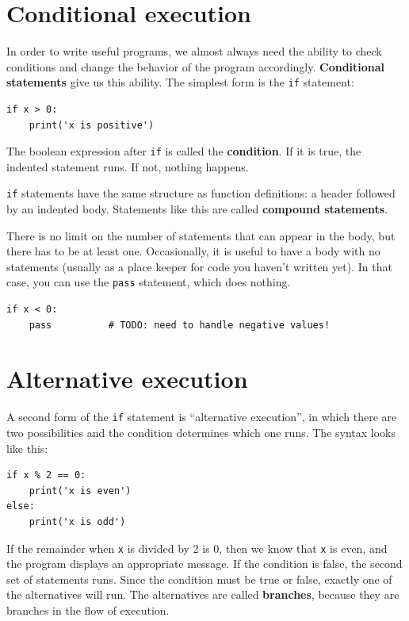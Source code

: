 \documentclass[10pt]{book}
\begin{document}
\section{Conditional execution}
\label{conditional.execution}

In order to write useful programs, we almost always need the ability
to check conditions and change the behavior of the program
accordingly.  {\bf Conditional statements} give us this ability.  The
simplest form is the {\tt if} statement:

\begin{verbatim}
if x > 0:
    print('x is positive')
\end{verbatim}
%
The boolean expression after {\tt if} is
called the {\bf condition}.  If it is true, the indented
statement runs.  If not, nothing happens.

{\tt if} statements have the same structure as function definitions:
a header followed by an indented body.  Statements like this are
called {\bf compound statements}.

There is no limit on the number of statements that can appear in
the body, but there has to be at least one.
Occasionally, it is useful to have a body with no statements (usually
as a place keeper for code you haven't written yet).  In that
case, you can use the {\tt pass} statement, which does nothing.

\begin{verbatim}
if x < 0:
    pass          # TODO: need to handle negative values!
\end{verbatim}
%

\section{Alternative execution}
\label{alternative.execution}

A second form of the {\tt if} statement is ``alternative execution'',
in which there are two possibilities and the condition determines
which one runs.  The syntax looks like this:

\begin{verbatim}
if x % 2 == 0:
    print('x is even')
else:
    print('x is odd')
\end{verbatim}
%
If the remainder when {\tt x} is divided by 2 is 0, then we know that
{\tt x} is even, and the program displays an appropriate message.  If
the condition is false, the second set of statements runs.
Since the condition must be true or false, exactly one of the
alternatives will run.  The alternatives are called {\bf
  branches}, because they are branches in the flow of execution.
\end{document}
